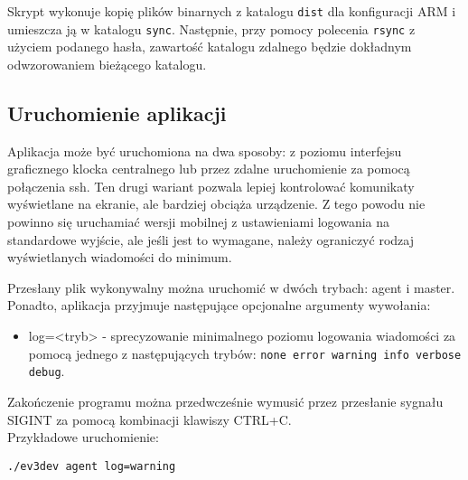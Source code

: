 Skrypt wykonuje kopię plików binarnych z katalogu {\tt dist} dla konfiguracji ARM i umieszcza ją w katalogu {\tt sync}. Następnie, przy pomocy polecenia {\tt rsync} z użyciem podanego hasła, zawartość katalogu zdalnego będzie dokładnym odwzorowaniem bieżącego katalogu.

\subsection{Uruchomienie aplikacji}

Aplikacja może być uruchomiona na dwa sposoby: z poziomu interfejsu graficznego klocka centralnego lub przez zdalne uruchomienie za pomocą połączenia ssh. Ten drugi wariant pozwala lepiej kontrolować komunikaty wyświetlane na ekranie, ale bardziej obciąża urządzenie. Z tego powodu nie powinno się uruchamiać wersji mobilnej z ustawieniami logowania na standardowe wyjście, ale jeśli jest to wymagane, należy ograniczyć rodzaj wyświetlanych wiadomości do minimum.

Przesłany plik wykonywalny można uruchomić w dwóch trybach: agent i master. Ponadto, aplikacja przyjmuje następujące opcjonalne argumenty wywołania:
\begin{itemize}
    \item log=<tryb> - sprecyzowanie minimalnego poziomu logowania wiadomości za pomocą jednego z następujących trybów: {\tt none error warning info verbose debug}.
\end{itemize}

Zakończenie programu można przedwcześnie wymusić przez przesłanie sygnału SIGINT za pomocą kombinacji klawiszy CTRL+C.\\


Przykładowe uruchomienie:
\begin{center}
    {\tt ./ev3dev agent log=warning}
\end{center}
